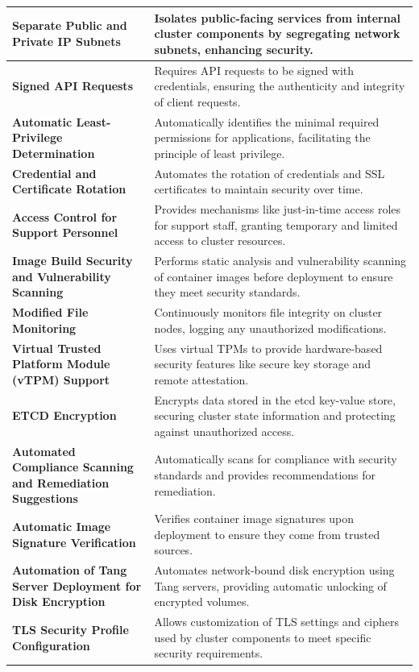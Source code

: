 \begin{longtable}{p{0.35\linewidth} p{0.65\linewidth}}
\hline
\textbf{Separate Public and Private IP Subnets} & Isolates public-facing services from internal cluster components by segregating network subnets, enhancing security. \\
\hline
\textbf{Signed API Requests} & Requires API requests to be signed with credentials, ensuring the authenticity and integrity of client requests. \\
\hline
\textbf{Automatic Least-Privilege Determination} & Automatically identifies the minimal required permissions for applications, facilitating the principle of least privilege. \\
\hline
\textbf{Credential and Certificate Rotation} & Automates the rotation of credentials and SSL certificates to maintain security over time. \\
\hline
\textbf{Access Control for Support Personnel} & Provides mechanisms like just-in-time access roles for support staff, granting temporary and limited access to cluster resources. \\
\hline
\textbf{Image Build Security and Vulnerability Scanning} & Performs static analysis and vulnerability scanning of container images before deployment to ensure they meet security standards. \\
\hline
\textbf{Modified File Monitoring} & Continuously monitors file integrity on cluster nodes, logging any unauthorized modifications. \\
\hline
\textbf{Virtual Trusted Platform Module (vTPM) Support} & Uses virtual TPMs to provide hardware-based security features like secure key storage and remote attestation. \\
\hline
\textbf{ETCD Encryption} & Encrypts data stored in the etcd key-value store, securing cluster state information and protecting against unauthorized access. \\
\hline
\textbf{Automated Compliance Scanning and Remediation Suggestions} & Automatically scans for compliance with security standards and provides recommendations for remediation. \\
\hline
\textbf{Automatic Image Signature Verification} & Verifies container image signatures upon deployment to ensure they come from trusted sources. \\
\hline
\textbf{Automation of Tang Server Deployment for Disk Encryption} & Automates network-bound disk encryption using Tang servers, providing automatic unlocking of encrypted volumes. \\
\hline
\textbf{TLS Security Profile Configuration} & Allows customization of TLS settings and ciphers used by cluster components to meet specific security requirements. \\

\end{longtable}
